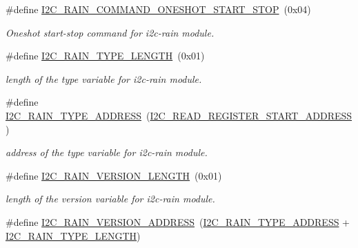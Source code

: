 \begin{DoxyCompactItemize}
\#define \hyperlink{registers-rain_8h_a7e69d765542130687c60f1009e2857ba}{I2\+C\+\_\+\+R\+A\+I\+N\+\_\+\+C\+O\+M\+M\+A\+N\+D\+\_\+\+O\+N\+E\+S\+H\+O\+T\+\_\+\+S\+T\+A\+R\+T\+\_\+\+S\+T\+OP}~(0x04)
\begin{DoxyCompactList}\small\item\em Oneshot start-\/stop command for i2c-\/rain module. \end{DoxyCompactList}\item 
\mbox{\label{registers-rain_8h_a181a38e0f8a5507ff2b088f9a3c89dc5}} 
\#define \hyperlink{registers-rain_8h_a181a38e0f8a5507ff2b088f9a3c89dc5}{I2\+C\+\_\+\+R\+A\+I\+N\+\_\+\+T\+Y\+P\+E\+\_\+\+L\+E\+N\+G\+TH}~(0x01)
\begin{DoxyCompactList}\small\item\em length of the type variable for i2c-\/rain module. \end{DoxyCompactList}\item 
\mbox{\label{registers-rain_8h_a3b11f9d8cde7778ef1b91e62b4805704}} 
\#define \hyperlink{registers-rain_8h_a3b11f9d8cde7778ef1b91e62b4805704}{I2\+C\+\_\+\+R\+A\+I\+N\+\_\+\+T\+Y\+P\+E\+\_\+\+A\+D\+D\+R\+E\+SS}~(\hyperlink{registers_8h_ad04d1b7c138bbfcc7672f00defb5f312}{I2\+C\+\_\+\+R\+E\+A\+D\+\_\+\+R\+E\+G\+I\+S\+T\+E\+R\+\_\+\+S\+T\+A\+R\+T\+\_\+\+A\+D\+D\+R\+E\+SS})
\begin{DoxyCompactList}\small\item\em address of the type variable for i2c-\/rain module. \end{DoxyCompactList}\item 
\mbox{\label{registers-rain_8h_a61a0b98368463356fd175c65ad070f70}} 
\#define \hyperlink{registers-rain_8h_a61a0b98368463356fd175c65ad070f70}{I2\+C\+\_\+\+R\+A\+I\+N\+\_\+\+V\+E\+R\+S\+I\+O\+N\+\_\+\+L\+E\+N\+G\+TH}~(0x01)
\begin{DoxyCompactList}\small\item\em length of the version variable for i2c-\/rain module. \end{DoxyCompactList}\item 
\mbox{\label{registers-rain_8h_a9e52019667b12e9673b9d8dcf051ad71}} 
\#define \hyperlink{registers-rain_8h_a9e52019667b12e9673b9d8dcf051ad71}{I2\+C\+\_\+\+R\+A\+I\+N\+\_\+\+V\+E\+R\+S\+I\+O\+N\+\_\+\+A\+D\+D\+R\+E\+SS}~(\hyperlink{registers-rain_8h_a3b11f9d8cde7778ef1b91e62b4805704}{I2\+C\+\_\+\+R\+A\+I\+N\+\_\+\+T\+Y\+P\+E\+\_\+\+A\+D\+D\+R\+E\+SS} + \hyperlink{registers-rain_8h_a181a38e0f8a5507ff2b088f9a3c89dc5}{I2\+C\+\_\+\+R\+A\+I\+N\+\_\+\+T\+Y\+P\+E\+\_\+\+L\+E\+N\+G\+TH})

\end{DoxyCompactItemize}
